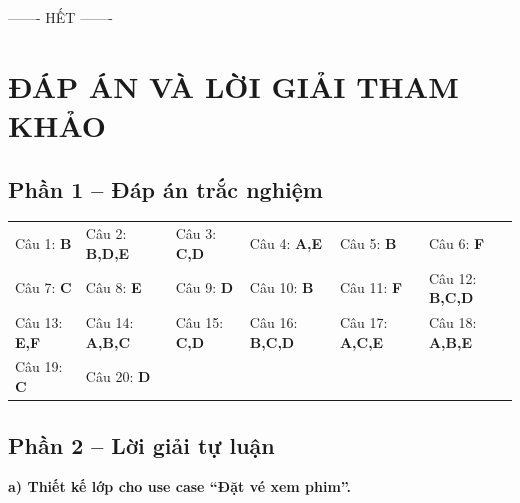 \documentclass[11pt,a4paper]{article}
\begin{document}
\par\vspace{6pt}\noindent\hfill ------- HẾT -------\hfill\null
\endgroup


\newpage
\section*{ĐÁP ÁN VÀ LỜI GIẢI THAM KHẢO}
\subsection*{Phần 1 -- Đáp án trắc nghiệm}
{\footnotesize\setlength{\tabcolsep}{3pt}
\begin{tabular}{llllll}
Câu 1: \textbf{B} & Câu 2: \textbf{B,D,E} & Câu 3: \textbf{C,D} & Câu 4: \textbf{A,E} & Câu 5: \textbf{B} & Câu 6: \textbf{F}\\
Câu 7: \textbf{C} & Câu 8: \textbf{E} & Câu 9: \textbf{D} & Câu 10: \textbf{B} & Câu 11: \textbf{F} & Câu 12: \textbf{B,C,D}\\
Câu 13: \textbf{E,F} & Câu 14: \textbf{A,B,C} & Câu 15: \textbf{C,D} & Câu 16: \textbf{B,C,D} & Câu 17: \textbf{A,C,E} & Câu 18: \textbf{A,B,E}\\
Câu 19: \textbf{C} & Câu 20: \textbf{D} & & & &
\end{tabular}}
\subsection*{Phần 2 -- Lời giải tự luận}
\textbf{a) Thiết kế lớp cho use case ``Đặt vé xem phim''.}
\end{document}
